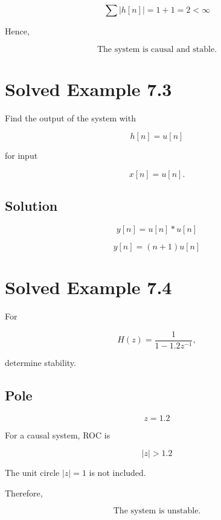 \[
\sum |h[n]|=1+1=2<\infty
\]

Hence,

\[
\boxed{
\text{The system is causal and stable.}
}
\]


\section{Solved Example 7.3}

Find the output of the system with

\[
h[n]=u[n]
\]

for input

\[
x[n]=u[n].
\]


\subsection{Solution}

\[
y[n]=u[n]*u[n]
\]

\[
y[n]=(n+1)u[n]
\]


\section{Solved Example 7.4}

For

\[
H(z)=
\frac{1}{1-1.2z^{-1}},
\]

determine stability.


\subsection{Pole}

\[
z=1.2
\]

For a causal system, ROC is

\[
|z|>1.2
\]

The unit circle \(|z|=1\) is not included.

Therefore,

\[
\boxed{
\text{The system is unstable.}
}
\]


